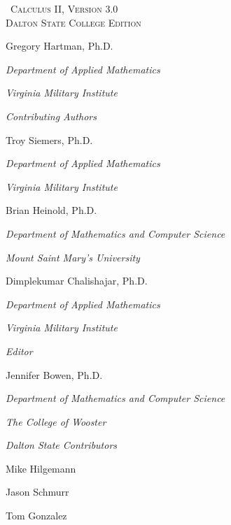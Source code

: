 
\hskip 125pt\begin{minipage}{\textwidth}
\begin{flushright}

\textsc{\large \apex\ {\Huge Calculus II}, {\small Version 3.0}} \\

\textsc{Dalton State College Edition}\\
{
\Large
\vspace{0.25in}

Gregory Hartman, Ph.D.

\emph{\small Department of Applied Mathematics}

\emph{\small Virginia Military Institute}\vskip15pt

\parbox{200pt}{\textit{Contributing Authors}}\hskip 2cm \phantom{.}

Troy Siemers, Ph.D.

\emph{\small Department of Applied Mathematics}

\emph{\small Virginia Military Institute}\vskip 15pt

Brian Heinold, Ph.D.

\emph{\small Department of Mathematics and Computer Science}

\emph{\small Mount Saint Mary's University}\vskip 15pt

Dimplekumar Chalishajar, Ph.D.

\emph{\small Department of Applied Mathematics}

\emph{\small Virginia Military Institute}\vskip 15pt

\parbox{200pt}{\textit{Editor}}\hskip 2cm \phantom{.}

Jennifer Bowen, Ph.D.

\emph{\small Department of Mathematics and Computer Science}

\emph{\small The College of Wooster} \vskip 15pt

\parbox{200pt}{\textit{Dalton State Contributors}}\hskip 2cm \phantom{.}

\normalsize

Mike Hilgemann \vskip 5pt

Jason Schmurr \vskip 5pt

Tom Gonzalez}
\end{flushright}
\end{minipage}

